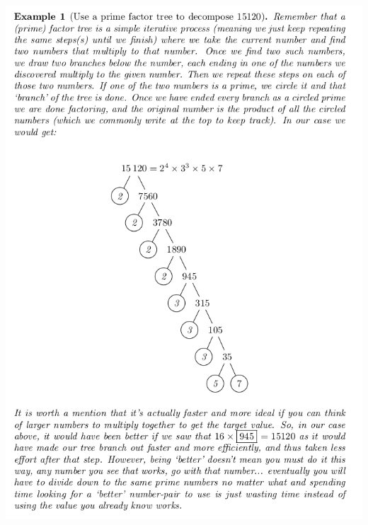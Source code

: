 \documentclass{ximeraXloud}
\begin{document}
        \begin{center}
        \includegraphics[width=\textwidth]{Ex1PrimeFactorTree.png}
        \end{center}
\end{document}
